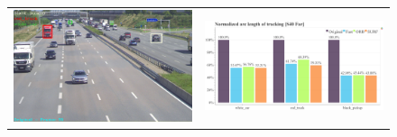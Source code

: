 \begin{figure}[!ht]
  \centering
  \begin{tabular}{cc}
    \includegraphics[width=0.45\linewidth]{diagrams/object_tracking/s40_n_far/frame.png}    &  
    \includegraphics[width=0.475\linewidth]{diagrams/object_tracking/s40_n_far/normalized_arc_lengths.html.png}    \\


\end{tabular}
\end{figure}
